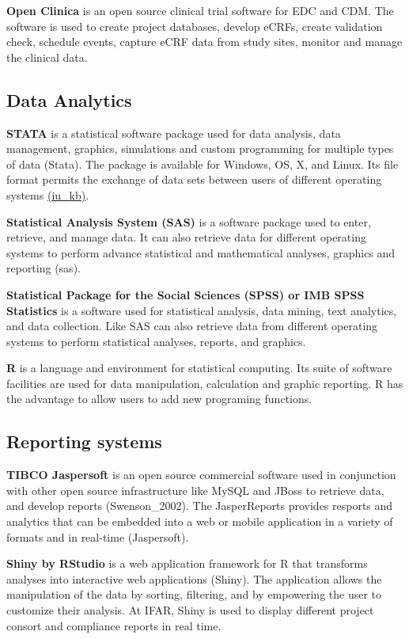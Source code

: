 \documentclass[]{book}
\theoremstyle{definition}
\theoremstyle{definition}
\theoremstyle{definition}
\theoremstyle{remark}
\begin{document}
\textbf{Open Clinica} is an open source clinical trial software for EDC
and CDM. The software is used to create project databases, develop
eCRFs, create validation check, schedule events, capture eCRF data from
study sites, monitor and manage the clinical data.

\subsection{Data Analytics}\label{data-analytics}

\textbf{STATA} is a statistical software package used for data analysis,
data management, graphics, simulations and custom programming for
multiple types of data (Stata). The package is available for Windows,
OS, X, and Linux. Its file format permits the exchange of data sets
between users of different operating systems
\href{https://kb.iu.edu/d/afly}{(iu\_kb)}.

\textbf{Statistical Analysis System (SAS)} is a software package used to
enter, retrieve, and manage data. It can also retrieve data for
different operating systems to perform advance statistical and
mathematical analyses, graphics and reporting (sas).

\textbf{Statistical Package for the Social Sciences (SPSS) or IMB SPSS
Statistics} is a software used for statistical analysis, data mining,
text analytics, and data collection. Like SAS can also retrieve data
from different operating systems to perform statistical analyses,
reports, and graphics.

\textbf{R} is a language and environment for statistical computing. Its
suite of software facilities are used for data manipulation, calculation
and graphic reporting. R has the advantage to allow users to add new
programing functions.

\subsection{Reporting systems}\label{reporting-systems}

\textbf{TIBCO Jaspersoft} is an open source commercial software used in
conjunction with other open source infrastructure like MySQL and JBoss
to retrieve data, and develop reports (Swenson\_2002). The JasperReports
provides resports and analytics that can be embedded into a web or
mobile application in a variety of formats and in real-time
(Jaspersoft).

\textbf{Shiny by RStudio} is a web application framework for R that
transforms analyses into interactive web applications (Shiny). The
application allows the manipulation of the data by sorting, filtering,
and by empowering the user to customize their analysis. At IFAR, Shiny
is used to display different project consort and compliance reports in
real time.
\end{document}

